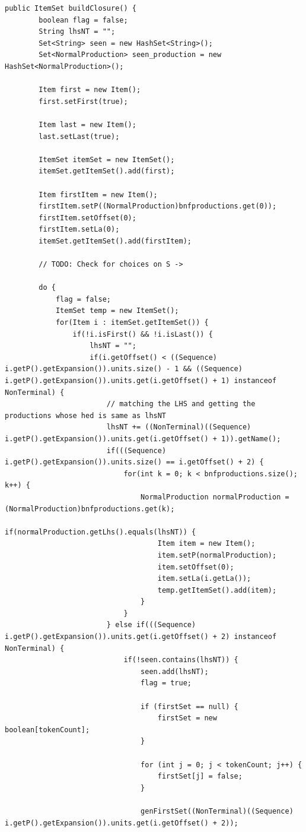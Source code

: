 \documentclass[•]{book}
\begin{document}
\begin{lstlisting}
public ItemSet buildClosure() {
		boolean flag = false;
		String lhsNT = "";
		Set<String> seen = new HashSet<String>();
		Set<NormalProduction> seen_production = new HashSet<NormalProduction>();
		
		Item first = new Item();
		first.setFirst(true);
		
		Item last = new Item();
		last.setLast(true);
		
		ItemSet itemSet = new ItemSet();
		itemSet.getItemSet().add(first);
		
		Item firstItem = new Item();
		firstItem.setP((NormalProduction)bnfproductions.get(0));
		firstItem.setOffset(0);
		firstItem.setLa(0);
		itemSet.getItemSet().add(firstItem);
		
		// TODO: Check for choices on S ->
		
		do {
			flag = false;
			ItemSet temp = new ItemSet();
			for(Item i : itemSet.getItemSet()) {
				if(!i.isFirst() && !i.isLast()) {
					lhsNT = "";
					if(i.getOffset() < ((Sequence) i.getP().getExpansion()).units.size() - 1 && ((Sequence) i.getP().getExpansion()).units.get(i.getOffset() + 1) instanceof NonTerminal) {
						// matching the LHS and getting the productions whose hed is same as lhsNT
						lhsNT += ((NonTerminal)((Sequence) i.getP().getExpansion()).units.get(i.getOffset() + 1)).getName();
						if(((Sequence) i.getP().getExpansion()).units.size() == i.getOffset() + 2) {
							for(int k = 0; k < bnfproductions.size(); k++) {
								NormalProduction normalProduction = (NormalProduction)bnfproductions.get(k);
								if(normalProduction.getLhs().equals(lhsNT)) {
									Item item = new Item();
									item.setP(normalProduction);
									item.setOffset(0);
									item.setLa(i.getLa());
									temp.getItemSet().add(item);
								}								
							}
						} else if(((Sequence) i.getP().getExpansion()).units.get(i.getOffset() + 2) instanceof NonTerminal) {
							if(!seen.contains(lhsNT)) {
								seen.add(lhsNT);
								flag = true;
							
								if (firstSet == null) {
									firstSet = new boolean[tokenCount];
								}
							
								for (int j = 0; j < tokenCount; j++) {
									firstSet[j] = false;
								}
					
								genFirstSet((NonTerminal)((Sequence) i.getP().getExpansion()).units.get(i.getOffset() + 2));
							

\end{lstlisting}
\end{document}
